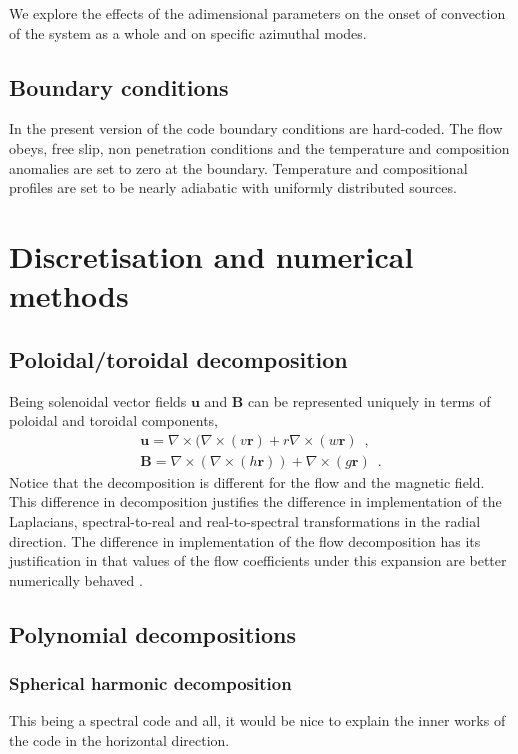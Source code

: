 \documentclass[a4paper,10pt]{book}
\renewcommand{\vec}[1]{\mathbf{#1}}
\begin{document}
We explore the effects of the adimensional parameters on the onset of convection
of the system as a whole and on specific azimuthal modes.

\section{Boundary conditions}
\label{s:boundaryConditions}
In the present version of the code boundary conditions are hard-coded.
The flow obeys, free slip, non penetration conditions and the temperature and
composition anomalies are set to zero at the boundary.
Temperature and compositional profiles are set to be nearly adiabatic with 
uniformly distributed sources.

\chapter{Discretisation and numerical methods}

\section{Poloidal/toroidal decomposition}
Being solenoidal vector fields  $\vec u$ and $\vec B$ can be represented
uniquely in terms of poloidal and toroidal components,
\begin{subequations}
\begin{gather}
\vec u = \nabla \times ( \nabla \times (v \vec r) +
         r \nabla \times ( w \vec r) \enspace , \\
\vec B = \nabla \times ( \nabla \times (h \vec r) ) +
         \nabla \times ( g \vec r) \enspace .
\end{gather}
\end{subequations}
Notice that the decomposition is different for the flow and the magnetic field.
This difference in decomposition justifies the difference in implementation of
the Laplacians, spectral-to-real and real-to-spectral transformations in the
radial direction. The difference in implementation of the flow decomposition has
its justification in that values of the flow coefficients under this expansion
are better numerically behaved \citep{Tilgner1999}.

\section{Polynomial decompositions}
\subsection{Spherical harmonic decomposition}
\label{s:SphericalHarmonicDecomp}
This being a spectral code and all, it would be nice to explain the inner works
of the code in the horizontal direction.
\end{document}
